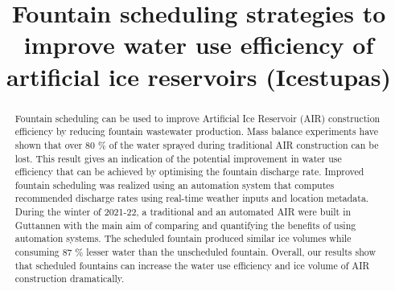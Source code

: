 \documentclass[tc, manuscript]{copernicus}
\begin{document}
\title{Fountain scheduling strategies to improve water use efficiency of artificial
ice reservoirs (Icestupas)}

\def\Authors{Suryanarayanan Balasubramanian\,$^{1,2}$, Martin Hoelzle\,$^{1}$Roger Waser\,$^{3}$,Martin Von Burg\,$^{3}$,}
\def\Address{$^{1}$University of Fribourg, Department of Geosciences, Fribourg, Switzerland $^{2}$University of
Applied Sciences and Arts, Luzern, Switzerland} \def\corrAuthor{Suryanarayanan Balasubramanian}





\maketitle

\begin{abstract}

  Fountain scheduling can be used to improve Artificial Ice Reservoir (AIR) construction efficiency by reducing
  fountain wastewater production. Mass balance experiments have shown that over 80 \% of the water sprayed
  during traditional AIR construction can be lost. This result gives an indication of the potential improvement
  in water use efficiency that can be achieved by optimising the fountain discharge rate. Improved fountain
  scheduling was realized using an automation system that computes recommended discharge rates using real-time
  weather inputs and location metadata. During the winter of 2021-22, a traditional and an automated AIR were
  built in Guttannen with the main aim of comparing and quantifying the benefits of using automation systems.
  The scheduled fountain produced similar ice volumes while consuming 87 \% lesser water than the unscheduled
  fountain.  Overall, our results show that scheduled fountains can increase the water use efficiency and ice
  volume of AIR construction dramatically.

\end{abstract}
\end{document}
